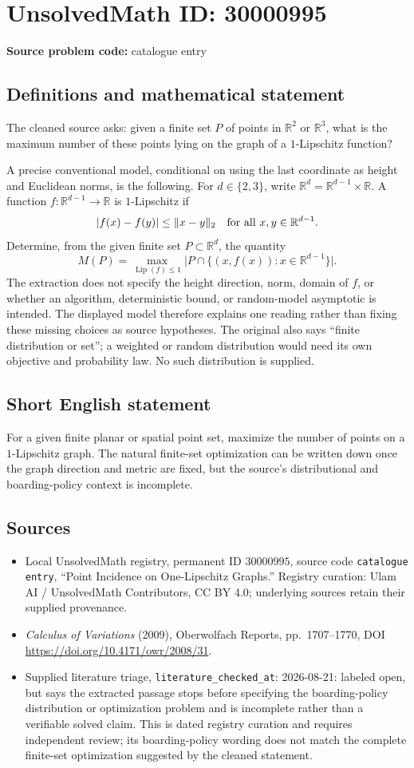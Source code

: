 \documentclass[11pt]{article}
\newcommand{\R}{\mathbb{R}}
\begin{document}
\section*{UnsolvedMath ID: 30000995}
\textbf{Source problem code:} catalogue entry
\subsection{Definitions and mathematical statement}
The cleaned source asks: given a finite set \(P\) of points in \(\R^2\) or \(\R^3\), what is the maximum number of these points lying on the graph of a \(1\)-Lipschitz function?

A precise conventional model, conditional on using the last coordinate as height and Euclidean norms, is the following. For \(d\in\{2,3\}\), write \(\R^d=\R^{d-1}\times\R\). A function \(f:\R^{d-1}\to\R\) is \(1\)-Lipschitz if
\[
|f(x)-f(y)|\leq\|x-y\|_2\quad\hbox{for all }x,y\in\R^{d-1}.
\]
Determine, from the given finite set \(P\subset\R^d\), the quantity
\[
M(P)=\max_{\operatorname{Lip}(f)\leq1}
\bigl|P\cap\{(x,f(x)):x\in\R^{d-1}\}\bigr|.
\]
The extraction does not specify the height direction, norm, domain of \(f\), or whether an algorithm, deterministic bound, or random-model asymptotic is intended. The displayed model therefore explains one reading rather than fixing these missing choices as source hypotheses. The original also says ``finite distribution or set''; a weighted or random distribution would need its own objective and probability law. No such distribution is supplied.
\subsection{Short English statement}
For a given finite planar or spatial point set, maximize the number of points on a \(1\)-Lipschitz graph. The natural finite-set optimization can be written down once the graph direction and metric are fixed, but the source's distributional and boarding-policy context is incomplete.
\subsection{Sources}
\begin{itemize}
\item Local UnsolvedMath registry, permanent ID \(30000995\), source code \texttt{catalogue entry}, ``Point Incidence on One-Lipschitz Graphs.'' Registry curation: Ulam AI / UnsolvedMath Contributors, CC BY 4.0; underlying sources retain their supplied provenance.
\item \emph{Calculus of Variations} (2009), Oberwolfach Reports, pp.\ 1707--1770, DOI \url{https://doi.org/10.4171/owr/2008/31}.
\item Supplied literature triage, \texttt{literature\_checked\_at}: 2026-08-21: labeled open, but says the extracted passage stops before specifying the boarding-policy distribution or optimization problem and is incomplete rather than a verifiable solved claim. This is dated registry curation and requires independent review; its boarding-policy wording does not match the complete finite-set optimization suggested by the cleaned statement.
\end{itemize}
\end{document}

